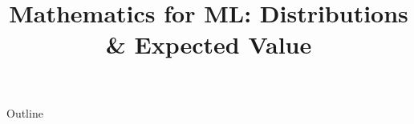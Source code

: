 \documentclass[xcolor=dvipsnames,compress,t,pdf,9pt]{beamer}
\title[\insertframenumber /\inserttotalframenumber]{Mathematics for ML: Distributions \& Expected Value}
\begin{document}
	\begin{frame}
	\titlepage
	\end{frame}

	\begin{frame}{Outline}
	    \tableofcontents
	\end{frame}

	
	
	
	
\end{document}

